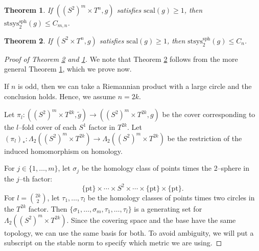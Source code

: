 \documentclass[10pt,a4paper]{amsart}
\newtheorem{theorem}{Theorem}
\begin{document}
\begin{theorem}\label{thm:txs2n}
If $((S^2)^m \times T^n, g)$ satisfies $\mathrm{scal}(g) \geq 1$, then $\mathrm{stsys}_2^{\mathrm{sph}}(g) \leq C_{m,n}$.
\end{theorem}

\begin{theorem}\label{thm:txs2}
If $(S^2 \times T^n, g)$ satisfies $\mathrm{scal}(g) \geq 1$, then $\mathrm{stsys}_2^{\mathrm{sph}}(g) \leq C_n$.
\end{theorem}

\begin{proof}[Proof of Theorem \ref{thm:txs2} and \ref{thm:txs2n}]
We note that Theorem \ref{thm:txs2} follows from the more general Theorem \ref{thm:txs2n}, which we prove now.

If $n$ is odd, then we can take a Riemannian product with a large circle and the conclusion holds. Hence, we assume $n = 2k$.

Let $\pi_l: ((S^2)^m \times T^{2k}, \tilde{g}) \to ((S^2)^m \times T^{2k}, g)$ be the cover corresponding to the $l$--fold cover of each $S^1$ factor in $T^{2k}$. Let $(\pi_l)_* : \Lambda_2((S^2)^m \times T^{2k}) \to \Lambda_2((S^2)^m \times T^{2k})$ be the restriction of the induced homomorphism on homology.

For $j \in \{1, \hdots, m\}$, let $\sigma_j$ be the homology class of points times the 2--sphere in the $j$--th factor:
\[ \{\mathrm{pt}\} \times \cdots \times S^2 \times \cdots \times \{\mathrm{pt}\} \times \{\mathrm{pt}\}. \]
For $l = \binom{2k}{2}$, let $\tau_1, \hdots, \tau_l$ be the homology classes of points times two circles in the $T^{2k}$ factor. Then $\{\sigma_1, \hdots, \sigma_m, \tau_1, \hdots, \tau_l\}$ is a generating set for $\Lambda_2((S^2)^m \times T^{2k})$. Since the covering space and the base have the same topology, we can use the same basis for both. To avoid ambiguity, we will put a subscript on the stable norm to specify which metric we are using.


\end{proof}
\end{document}
